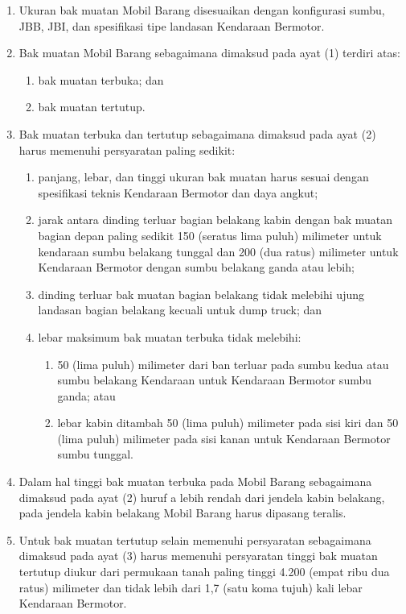 \begin{enumerate}
  \item Ukuran bak muatan Mobil Barang disesuaikan dengan konfigurasi sumbu, JBB, JBI, dan spesifikasi tipe landasan Kendaraan Bermotor.
  \item Bak muatan Mobil Barang sebagaimana dimaksud pada ayat (1) terdiri atas:
  \begin{enumerate}
    \item bak muatan terbuka; dan
    \item bak muatan tertutup. 
  \end{enumerate}
  \item Bak muatan terbuka dan tertutup sebagaimana dimaksud pada ayat (2) harus memenuhi persyaratan paling sedikit:
  \begin{enumerate}
    \item panjang, lebar, dan tinggi ukuran bak muatan harus sesuai dengan spesifikasi teknis Kendaraan Bermotor dan daya angkut;
    \item jarak antara dinding terluar bagian belakang kabin dengan bak muatan bagian depan paling sedikit 150 (seratus lima puluh) milimeter untuk kendaraan sumbu belakang tunggal dan 200 (dua ratus) milimeter untuk Kendaraan Bermotor dengan sumbu belakang ganda atau lebih;
    \item dinding terluar bak muatan bagian belakang tidak melebihi ujung landasan bagian belakang kecuali untuk dump truck; dan
    \item lebar maksimum bak muatan terbuka tidak melebihi:
    \begin{enumerate}
      \item 50 (lima puluh) milimeter dari ban terluar pada sumbu kedua atau sumbu belakang Kendaraan untuk Kendaraan Bermotor sumbu ganda; atau
      \item lebar kabin ditambah 50 (lima puluh) milimeter pada sisi kiri dan 50 (lima puluh) milimeter pada sisi kanan untuk Kendaraan Bermotor sumbu tunggal.
    \end{enumerate} 
  \end{enumerate}
  \item Dalam hal tinggi bak muatan terbuka pada Mobil Barang sebagaimana dimaksud pada ayat (2) huruf a lebih rendah dari jendela kabin belakang, pada jendela kabin belakang Mobil Barang harus dipasang teralis.
  \item Untuk bak muatan tertutup selain memenuhi persyaratan sebagaimana dimaksud pada ayat (3) harus memenuhi persyaratan tinggi bak muatan tertutup diukur dari permukaan tanah paling tinggi 4.200 (empat ribu dua ratus) milimeter dan tidak lebih dari 1,7 (satu koma tujuh) kali lebar Kendaraan Bermotor.
\end{enumerate}

